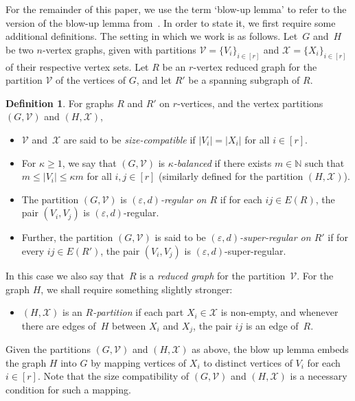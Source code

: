 \documentclass[final]{article}
\theoremstyle{definition}
\newtheorem{definition}[theorem]{Definition}
\newcommand{\eps}{\varepsilon}
\begin{document}
For the remainder of this paper, we use the term `blow-up lemma' to refer to the version of the blow-up lemma from~\cite{sparse_blowup}. In order to state it, we first require some additional definitions. The setting in which we work is as follows. Let~$G$ and~$H$ be two $n$-vertex graphs, given with partitions
$\mathcal{V}=\{V_i\}_{i\in[r]}$ and $\mathcal{X}=\{X_i\}_{i\in[r]}$ of their respective vertex sets. Let $R$ be an $r$-vertex reduced graph for the partition $\mathcal{V}$ of the vertices of $G$, and let $R'$ be a spanning subgraph of $R$.

\begin{definition}
\label{defn:sparseBL_generic_terms} 
For graphs $R$ and $R'$ on $r$-vertices, and the vertex partitions $(G,\mathcal{V})$ and $(H, \mathcal{X})$,

    \begin{itemize}
        \item $\mathcal{V}$ and~$\mathcal{X}$ are said to be \emph{size-compatible} if $|V_i|=|X_i|$ for all $i\in[r]$.
        \item For $\kappa\geq 1$, we say that $(G,\mathcal{V})$ is
        \emph{$\kappa$-balanced} if there exists $m\in\mathbb{N}$ such that $m\leq |V_i|\leq \kappa m$ for all $i, j\in[r]$ (similarly defined for the partition $(H, \mathcal{X})$).

         \item The partition $(G,\mathcal{V})$ is \emph{$(\eps,d)$-regular on $R$} if for each $ij\in E(R)$, the pair $(V_i,V_j)$ is $(\eps,d)$-regular.

         \item Further, the partition $(G,\mathcal{V})$ is said to be \emph{$(\eps,d)$-super-regular on $R'$} if for every $ij\in E(R')$, the pair $(V_i,V_j)$ is $(\eps,d)$-super-regular.

    \end{itemize}
  In this case we also say that~$R$ is a \emph{reduced graph} for the partition~$\mathcal{V}$. For the graph $H$, we shall require something slightly stronger: 
  \begin{itemize}
    \item $(H,\mathcal{X})$ is an \emph{$R$-partition} if each part $X_i \in \mathcal{X}$ is non-empty, and whenever there are edges of~$H$ between $X_i$ and $X_j$, the pair $ij$ is an edge of~$R$.
 \end{itemize}
\end{definition}

Given the partitions $(G, \mathcal{V})$ and $(H, \mathcal{X})$ as above, the blow up lemma embeds the graph $H$ into $G$ by mapping vertices of $X_i$ to distinct vertices of $V_i$ for each $i \in [r]$. Note that the size compatibility of $(G, \mathcal{V})$ and $(H, \mathcal{X})$ is a necessary condition for such a mapping.  
\end{document}
